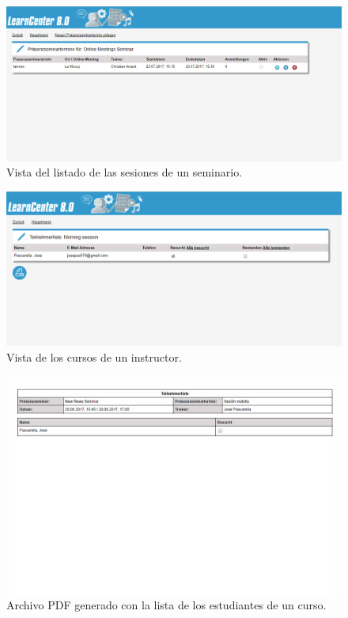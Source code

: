 \begin{figure}[h]
	\begin{center}
		\includegraphics[width=\textwidth]{screenshots/listar_sesiones_seminario.png}
		\caption{Vista del listado de las sesiones de un seminario.} \label{fig:listarSesiones}
	\end{center}
\end{figure}

\begin{figure}[h]
	\begin{center}
		\includegraphics[width=\textwidth]{screenshots/manage_session.png}
		\caption{Vista de los cursos de un instructor.} \label{fig:gestionarSesion}
	\end{center}
\end{figure}

\begin{figure}[h]
	\begin{center}
		\includegraphics[width=\textwidth]{screenshots/lista_alumnos.png}
		\caption{Archivo PDF generado con la lista de los estudiantes de un curso.} \label{fig:listarAlumnos}
	\end{center}
\end{figure}

